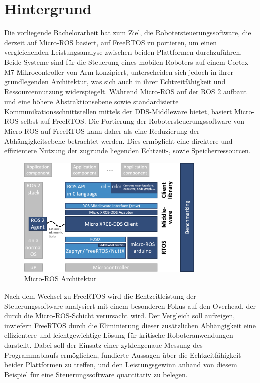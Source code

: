 \section{Hintergrund}

Die vorliegende Bachelorarbeit hat zum Ziel, die Robotersteuerungssoftware, die
derzeit auf Micro-ROS basiert, auf FreeRTOS zu portieren, um einen
vergleichenden Leistungsanalyse zwischen beiden Plattformen durchzuführen. Beide
Systeme sind für die Steuerung eines mobilen Roboters auf einem Cortex-M7
Mikrocontroller von Arm konzipiert, unterscheiden sich jedoch in ihrer
grundlegenden Architektur, was sich auch in ihrer Echtzeitfähigkeit und
Ressourcennutzung widerspiegelt. Während Micro-ROS auf der \ac{ROS 2} aufbaut
und eine höhere Abstraktionsebene sowie standardisierte
Kommunikationsschnittstellen mittels der \ac{DDS}-Middleware bietet, basiert
Micro-ROS selbst auf FreeRTOS. Die Portierung der Robotersteuerungssoftware von
Micro-ROS auf FreeRTOS kann daher als eine Reduzierung der Abhängigkeitsebene
betrachtet werden. Dies ermöglicht eine direktere und effizientere Nutzung der
zugrunde liegenden Echtzeit-, sowie Speicherressourcen.

\begin{figure}[htb] \centering
    \includegraphics[width=0.8\textwidth]{assets/Micro-ROS_architecture}
    \caption{Micro-ROS Architektur\cite[S. 6]{koubaa2023}}
\end{figure}

Nach dem Wechsel zu FreeRTOS wird die Echtzeitleistung der Steuerungssoftware
analysiert mit einem besonderen Fokus auf den Overhead, der durch die
Micro-ROS-Schicht verursacht wird. Der Vergleich soll aufzeigen, inwiefern
FreeRTOS durch die Eliminierung dieser zusätzlichen Abhängigkeit eine
effizientere und leichtgewichtige Lösung für kritische Roboteranwendungen
darstellt. Dabei soll der Einsatz einer zyklengenaue Messung des Programmablaufs
ermöglichen, fundierte Aussagen über die Echtzeitfähigkeit beider Plattformen zu
treffen, und den Leistungsgewinn anhand von diesem Beispiel für eine
Steuerungssoftware quantitativ zu belegen.

